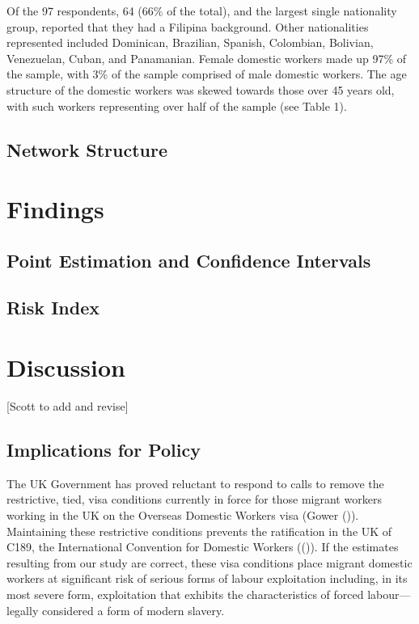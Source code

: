 \documentclass[
  12pt,
]{article}
\theoremstyle{plain}
\theoremstyle{definition}
\begin{document}
Of the 97 respondents, 64 (66\% of the total), and the largest single
nationality group, reported that they had a Filipina background. Other
nationalities represented included Dominican, Brazilian, Spanish,
Colombian, Bolivian, Venezuelan, Cuban, and Panamanian. Female domestic
workers made up 97\% of the sample, with 3\% of the sample comprised of
male domestic workers. The age structure of the domestic workers was
skewed towards those over 45 years old, with such workers representing
over half of the sample (see Table 1).

\subsection{Network Structure}\label{network-structure}

\section{Findings}\label{findings}

\subsection{Point Estimation and Confidence
Intervals}\label{point-estimation-and-confidence-intervals}

\subsection{Risk Index}\label{risk-index}

\section{Discussion}\label{discussion}

{[}Scott to add and revise{]}

\subsection{Implications for Policy}\label{implications-for-policy}

The UK Government has proved reluctant to respond to calls to remove the
restrictive, tied, visa conditions currently in force for those migrant
workers working in the UK on the Overseas Domestic Workers visa (Gower
()). Maintaining these restrictive
conditions prevents the ratification in the UK of C189, the
International Convention for Domestic Workers
(()). If the estimates
resulting from our study are correct, these visa conditions place
migrant domestic workers at significant risk of serious forms of labour
exploitation including, in its most severe form, exploitation that
exhibits the characteristics of forced labour---legally considered a
form of modern slavery.
\end{document}
